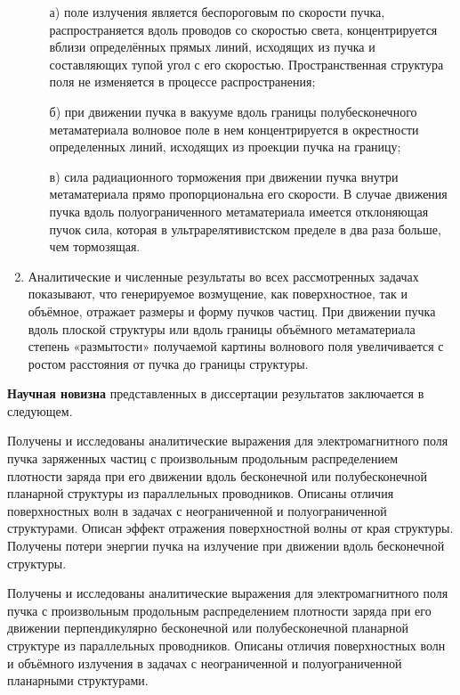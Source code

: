 \begin{enumerate}
\begin{itemize}
        \item[а)] поле излучения является беспороговым по скорости пучка, распространяется вдоль проводов со скоростью света, концентрируется вблизи определённых прямых линий, исходящих из пучка и составляющих тупой угол с его скоростью. Пространственная структура поля не изменяется в процессе распространения;
        \item[б)] при движении пучка в вакууме вдоль границы полубесконечного метаматериала волновое поле в нем концентрируется в окрестности определенных линий, исходящих из проекции пучка на границу;
        \item[в)] сила радиационного торможения при движении пучка внутри метаматериала прямо пропорциональна его скорости. В случае движения пучка вдоль полуограниченного метаматериала имеется отклоняющая пучок сила, которая в ультрарелятивистском пределе в два раза больше, чем тормозящая.
      \end{itemize}
  \item Аналитические и численные результаты во всех рассмотренных задачах показывают, что генерируемое возмущение, как поверхностное, так и объёмное, отражает размеры и форму пучков частиц. При движении пучка вдоль плоской структуры или вдоль границы объёмного метаматериала степень «размытости» получаемой картины волнового поля увеличивается с ростом расстояния от пучка до границы структуры.
\end{enumerate}

\hfill

\textbf{Научная новизна} представленных в диссертации результатов заключается в следующем.

Получены и исследованы аналитические выражения для электромагнитного поля пучка заряженных частиц с произвольным продольным распределением плотности заряда при его движении вдоль бесконечной или полубесконечной планарной структуры из параллельных проводников. Описаны отличия поверхностных волн в задачах с неограниченной и полуограниченной структурами. Описан эффект отражения поверхностной волны от края структуры. Получены потери энергии пучка на излучение при движении вдоль бесконечной структуры.

Получены и исследованы аналитические выражения для электромагнитного поля пучка с произвольным продольным распределением плотности заряда при его движении перпендикулярно бесконечной или полубесконечной планарной структуре из параллельных проводников. Описаны отличия поверхностных волн и объёмного излучения в задачах с неограниченной и полуограниченной планарными структурами.

